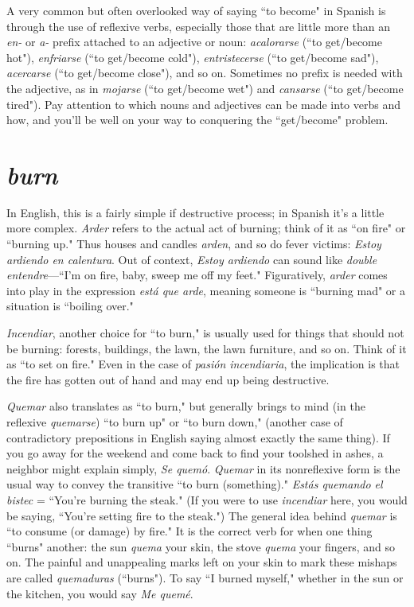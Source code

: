 A very common but often overlooked way of saying ``to become" in Spanish is through the use of reflexive verbs, especially those
that are little more than an \emph{en-} or \emph{a-} prefix attached to an adjective or
noun: \emph{acalorarse} (``to get/become hot"), \emph{enfriarse} (``to get/become
cold"), \emph{entristecerse} (``to get/become sad"), \emph{acercarse} (``to get/become
close"), and so on. Sometimes no prefix is needed with the adjective,
as in \emph{mojarse} (``to get/become wet") and \emph{cansarse} (``to get/become
tired"). Pay attention to which nouns and adjectives can be made into
verbs and how, and you'll be well on your way to conquering the ``get/become" problem.

\section{\emph{burn}}

In English, this is a fairly simple if destructive process; in
Spanish it's a little more complex. \emph{Arder} refers to the actual act of
burning; think of it as ``on fire" or ``burning up." Thus houses and
candles \emph{arden}, and so do fever victims: \emph{Estoy ardiendo en calentura}.
Out of context, \emph{Estoy ardiendo} can sound like \emph{double entendre}---``I'm
on fire, baby, sweep me off my feet." Figuratively, \emph{arder} comes into
play in the expression \emph{está que arde}, meaning someone is ``burning
mad" or a situation is ``boiling over."

\emph{Incendiar}, another choice for ``to burn," is usually used for
things that should not be burning: forests, buildings, the lawn, the
lawn furniture, and so on. Think of it as ``to set on fire." Even in the
case of \emph{pasión incendiaria}, the implication is that the fire has gotten
out of hand and may end up being destructive.

\emph{Quemar} also translates as ``to burn," but generally brings to
mind (in the reflexive \emph{quemarse}) ``to burn up" or ``to burn down," (another case of contradictory prepositions in English saying almost exactly the same thing). If you go away for the weekend and come back
to find your toolshed in ashes, a neighbor might explain simply, \emph{Se
	quemó}. \emph{Quemar} in its nonreflexive form is the usual way to convey the
transitive ``to burn (something)." \emph{Estás quemando el bistec} = ``You're
burning the steak." (If you were to use \emph{incendiar} here, you would be
saying, ``You're setting fire to the steak.") The general idea behind \emph{quemar} is ``to consume (or damage) by fire." It is the correct verb for when
one thing ``burns" another: the sun \emph{quema} your skin, the stove \emph{quema}
your fingers, and so on. The painful and unappealing marks left on
your skin to mark these mishaps are called \emph{quemaduras} (``burns"). To
say ``I burned myself," whether in the sun or the kitchen, you would
say \emph{Me quemé}.

